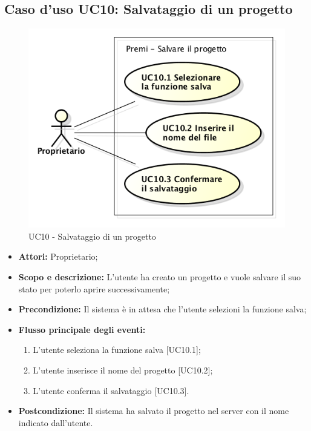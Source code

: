 \subsection{Caso d'uso UC10: Salvataggio di un progetto}
\begin{figure}[h] 
	\centering 
	\includegraphics[scale=0.45] {img/UC10.png} 
	\caption{UC10 - Salvataggio di un progetto} 
\end{figure}

\begin{itemize}
	\item \textbf{Attori:} Proprietario;
	\item \textbf{Scopo e descrizione:} L'utente ha creato un progetto e vuole salvare il suo stato per poterlo aprire successivamente;
	\item \textbf{Precondizione:} Il sistema è in attesa che l'utente selezioni la funzione salva;
	\item \textbf{Flusso principale degli eventi:}
	\begin{enumerate}
		\item L'utente seleziona la funzione salva [UC10.1];
		\item L'utente inserisce il nome del progetto [UC10.2];
		\item L'utente conferma il salvataggio [UC10.3].
	\end{enumerate}
	\item \textbf{Postcondizione:} Il sistema ha salvato il progetto nel server con il nome indicato dall'utente.
\end{itemize}


